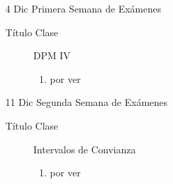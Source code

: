 \documentclass[letterpaper,12pt]{article}
\begin{document}
\begin{itemize}
  \item[4 Dic] Primera Semana de Exámenes
  \begin{description}
  \item[Título Clase] DPM IV
  \begin{enumerate}
  \item por ver
  \end{enumerate}
  \end{description}
  
  \item[11 Dic] Segunda Semana de Exámenes
  \begin{description}
  \item[Título Clase] Intervalos de Convianza
  \begin{enumerate}
  \item por ver
  \end{enumerate}
  \end{description}

  
\end{itemize}
\end{document}
